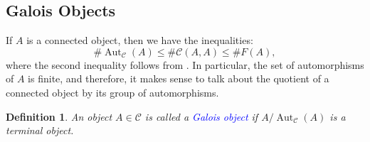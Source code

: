 \documentclass[10pt]{article}
\theoremstyle{thmstyle}
\theoremstyle{defstyle}
\newtheorem{definition}[theorem]{Definition}
\newcommand{\Aut}{\operatorname{Aut}}
\newcommand{\scrC}{\mathscr{C}} %
\newcommand{\define}[1]{\textcolor{blue}{\textit{#1}}}
\renewcommand{\le}{\leqslant}
\begin{document}
\subsection{Galois Objects}

If $A$ is a connected object, then we have the inequalities: 
\begin{equation*}
    \#\Aut_{\scrC}(A)\le\#\scrC(A, A)\le\# F(A),
\end{equation*}
where the second inequality follows from . In particular, the set of automorphisms of $A$ is finite, and therefore, it makes sense to talk about the quotient of a connected object by its group of automorphisms.

\begin{definition}
    An object $A\in\scrC$ is called a \define{Galois object} if $A/\Aut_{\scrC}(A)$ is a terminal object.
\end{definition}

\end{document}
